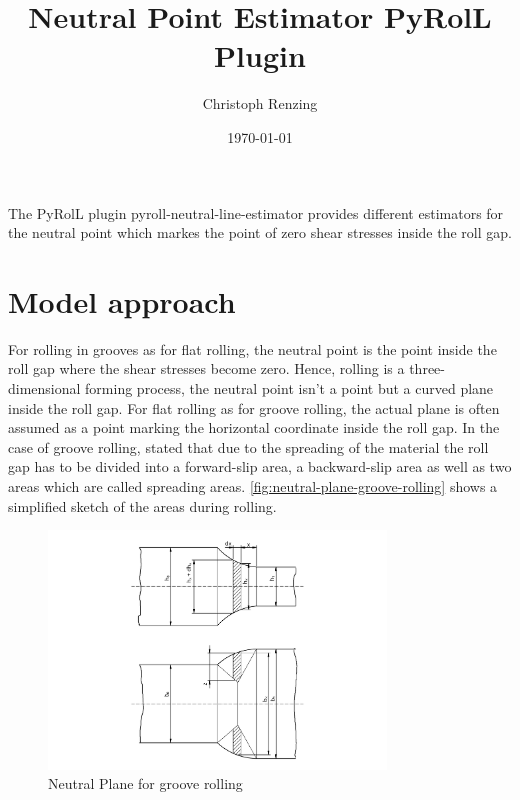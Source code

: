 \documentclass[11pt]{PyRollDocs}
\begin{document}
    \title{Neutral Point Estimator PyRolL Plugin}
    \author{Christoph Renzing}
    \date{\today}

    \maketitle

    The PyRolL plugin pyroll-neutral-line-estimator provides different estimators for the neutral point which markes the point of zero shear stresses inside the roll gap.


    \section{Model approach}\label{sec:model-approach}

    For rolling in grooves as for flat rolling, the neutral point is the point inside the roll gap where the shear stresses become zero.
    Hence, rolling is a three-dimensional forming process, the neutral point isn't a point but a curved plane inside the roll gap.
    For flat rolling as for groove rolling, the actual plane is often assumed as a point marking the horizontal coordinate inside the roll gap.
    In the case of groove rolling, \textcite{Kunzman1977} stated that due to the spreading of the material the roll gap has to be divided into a forward-slip area, a backward-slip area
    as well as two areas which are called spreading areas.
    \autoref{fig:neutral-plane-groove-rolling} shows a simplified sketch of the areas during rolling.

    \begin{figure}
        \centering
        \includegraphics[width=0.8\textwidth]{img/kunzmann_neutral_plane}
        \caption{Neutral Plane for groove rolling}
        \label{fig:neutral-plane-groove-rolling}
    \end{figure}
\end{document}
